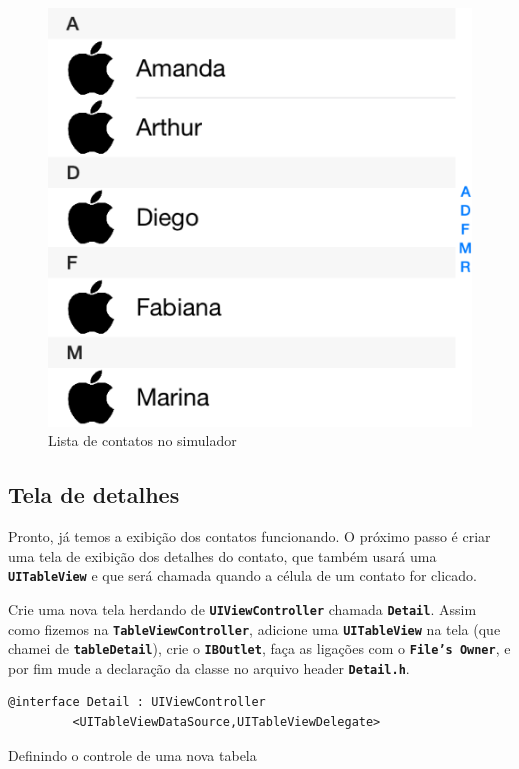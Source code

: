 \documentclass[a4paper,12pt,brazil,oneside]{book}
\begin{document}
\begin{figure}[H]
  \centering
  \includegraphics[width=.75\textwidth]{figuras/table/table3.png}
  \caption{Lista de contatos no simulador}
  \label{fig:a}
\end{figure}

\subsection{Tela de detalhes}


Pronto, já temos a exibição dos contatos funcionando. O próximo passo é criar uma tela de exibição dos detalhes do contato, que também usará uma \texttt{\textbf{UITableView}} e que será chamada quando a célula de um contato for clicado.

Crie uma nova tela herdando de \texttt{\textbf{UIViewController}} chamada \texttt{\textbf{Detail}}. Assim como fizemos na \texttt{\textbf{TableViewController}}, adicione uma \texttt{\textbf{UITableView}} na tela (que chamei de \texttt{\textbf{tableDetail}}), crie o \texttt{\textbf{IBOutlet}}, faça as ligações com o \texttt{\textbf{File's Owner}}, e por fim mude a declaração da classe no arquivo header \texttt{\textbf{Detail.h}}.

\begin{listing}[H]
\begin{verbatim}
@interface Detail : UIViewController
         <UITableViewDataSource,UITableViewDelegate>
\end{verbatim}
\caption{Definindo o controle de uma nova tabela}
\end{listing}
\end{document}
